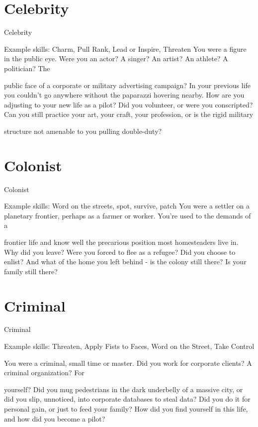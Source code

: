                                                                                                                 

\section{Celebrity}
                                                    Celebrity  

Example skills: Charm, Pull Rank, Lead or Inspire, Threaten  
You were a figure in the public eye. Were you an actor? A singer? An artist? An athlete? A politician? The  

public face of a corporate or military advertising campaign? In your previous life you couldn’t go anywhere  
without the paparazzi hovering nearby. How are you adjusting to your new life as a pilot? Did you volunteer,  
or were you conscripted? Can you still practice your art, your craft, your profession, or is the rigid military  

structure not amenable to you pulling double-duty?   
\section{Colonist}
                                                    Colonist  

Example skills: Word on the streets, spot, survive, patch  
You were a settler on a planetary frontier, perhaps as a farmer or worker. You’re used to the demands of a  

frontier life and know well the precarious position most homesteaders live in. Why did you leave? Were you  
forced to flee as a refugee? Did you choose to enlist? And what of the home you left behind - is the colony  
still there? Is your family still there?   
\section{Criminal}
                                                    Criminal  

Example skills: Threaten, Apply Fists to Faces, Word on the Street, Take Control  

You were a criminal, small time or master. Did you work for corporate clients? A criminal organization? For  

yourself? Did you mug pedestrians in the dark underbelly of a massive city, or did you slip, unnoticed, into  
corporate databases to steal data? Did you do it for personal gain, or just to feed your family? How did you  
find yourself in this life, and how did you become a pilot?
 
